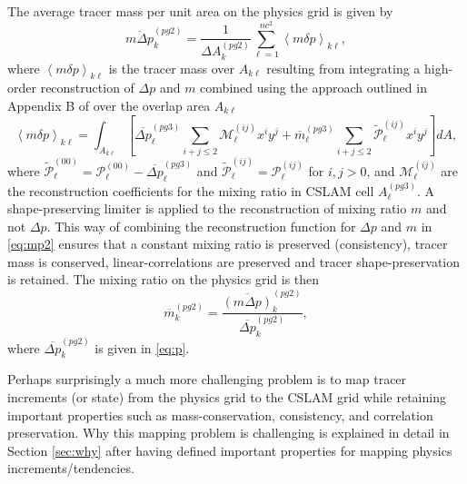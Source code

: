 \documentclass[draft,linenumbers]{agujournal}
\begin{document}
The average tracer mass per unit area on the physics grid is given by
\begin{equation}
\label{eq:mp}
\overline{m\Delta p}^{(pg2)}_k=\frac{1}{\Delta A^{(pg2)}_k}\sum_{\ell=1}^{nc^2}\left< m\delta p\right>_{k\ell},
\end{equation}
where $\left< m\delta p\right>_{k\ell}$ is the tracer mass over $A_{k\ell}$ resulting from integrating a high-order reconstruction of $\Delta p$ and $m$ combined using the approach outlined in Appendix B of \cite{NL2010JCP} over the overlap area $A_{k\ell}$
\begin{equation}
\label{eq:mp2}
\left< m\delta p\right>_{k\ell}=\int_{A_{k\ell}}\left[ \overline{\Delta p}_\ell^{(pg3)}\sum_{i+j\le 2}{\mathcal{M}}^{(ij)}_\ell x^{i}y^{j}+{\overline{m}}_\ell^{(pg3)}\sum_{i+j\le 2}{\widetilde{{\mathcal{P}}}}^{(ij)}_\ell x^{i}y^{j}\right] dA,
\end{equation}
where ${\widetilde{{\mathcal{P}}}}^{(00)}_\ell={\mathcal{P}}^{(00)}_\ell-\overline{\Delta p}^{(pg3)}_\ell$ and ${\widetilde{{\mathcal{P}}}}^{(ij)}_\ell={\mathcal{P}}^{(ij)}_\ell$ for $i,j>0$, and ${\mathcal{M}}^{(ij)}_\ell$ are the reconstruction coefficients for the mixing ratio in CSLAM cell $A^{(pg3)}_\ell$. A shape-preserving limiter is applied to the reconstruction of mixing ratio $m$ \citep{BJ1989} and not $\Delta p$. This way of combining the reconstruction function for $\Delta p$ and $m$ in \eqref{eq:mp2} ensures that a constant mixing ratio is preserved (consistency), tracer mass is conserved, linear-correlations are preserved and tracer shape-preservation is retained. The mixing ratio on the physics grid is then
\begin{equation}
{\overline{m}}^{(pg2)}_k=\frac{\overline{\left( m\Delta p\right)}^{(pg2)}_k}{\overline{\Delta p}^{(pg2)}_k},
\end{equation}
where $\overline{\Delta p}^{(pg2)}_k$ is given in \eqref{eq:p}. 

Perhaps surprisingly a much more challenging problem is to map tracer increments (or state) from the physics grid to the CSLAM grid while retaining important properties such as mass-conservation, consistency, and correlation preservation. Why this mapping problem is challenging is explained in detail in Section \ref{sec:why} after having defined important properties for mapping physics increments/tendencies.
\end{document}
